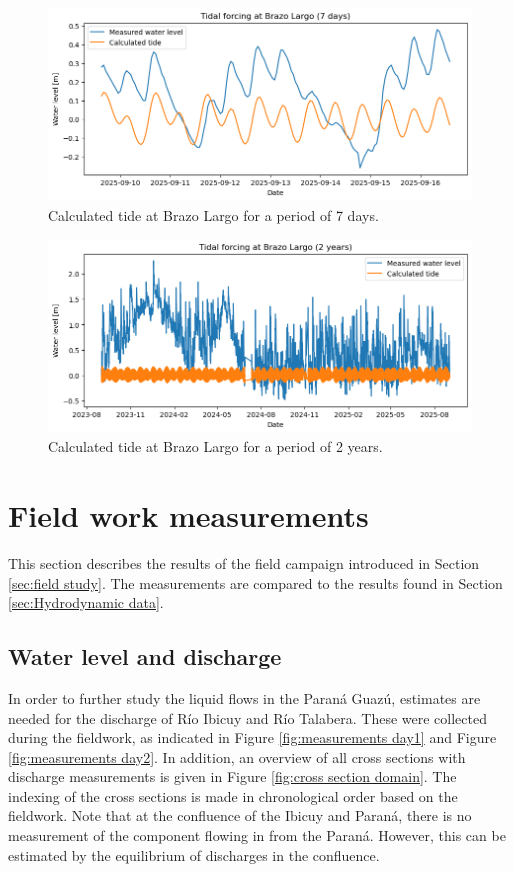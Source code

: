 \begin{figure}[H]
    \centering
    \includegraphics[width=1\linewidth]{figures/ch5/Tide_Brazo_largo.png}
    \caption{Calculated tide at Brazo Largo for a period of 7 days.}
    \label{fig:period 7}
\end{figure}
\begin{figure}[H]
    \centering
    \includegraphics[width=1\linewidth]{figures/ch5/Tide_BL_2y.png}
    \caption{Calculated tide at Brazo Largo for a period of 2 years.}
    \label{fig:period 2}
\end{figure}



\newpage
\section{Field work measurements}
This section describes the results of the field campaign introduced in Section \ref{sec:field study}. The measurements are compared to the results found in Section \ref{sec:Hydrodynamic data}.


\subsection{Water level and discharge}
In order to further study the liquid flows in the Paraná Guazú, estimates are needed for the discharge of Río Ibicuy and Río Talabera. These were collected during the fieldwork, as indicated in Figure \ref{fig:measurements day1} and Figure \ref{fig:measurements day2}. In addition, an overview of all cross sections with discharge measurements is given in Figure \ref{fig:cross section domain}. The indexing of the cross sections is made in chronological order based on the fieldwork. Note that at the confluence of the Ibicuy and Paraná, there is no measurement of the component flowing in from the Paraná. However, this can be estimated by the equilibrium of discharges in the confluence. 

